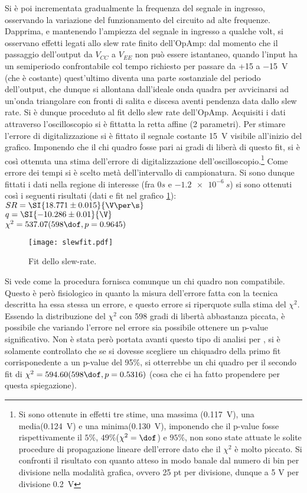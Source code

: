 Si è poi incrementata gradualmente la frequenza del segnale in ingresso, osservando la variazione del funzionamento del circuito ad alte frequenze.
Dapprima, e mantenendo l'ampiezza del segnale in ingresso a qualche volt, si osservano effetti legati allo slew rate finito dell'OpAmp: dal momento che il passaggio dell'output da $V_{CC}$ a $V_{EE}$ non può essere istantaneo, quando l'input ha un semiperiodo confrontabile col tempo richiesto per passare da +15 a \SI{-15}{\V} (che è costante) quest'ultimo diventa una parte sostanziale del periodo dell'output, che dunque si allontana dall'ideale onda quadra per avvicinarsi ad un'onda triangolare con fronti di salita e discesa aventi pendenza data dallo slew rate.
Si è dunque proceduto al fit dello slew rate dell'OpAmp. Acquisiti i dati attraverso l'oscilloscopio si è fittatta la retta affine (2 parametri). Per stimare l'errore di digitalizzazione si è fittato il segnale costante \SI{15}{\V} visibile all'inizio del grafico. Imponendo che il chi quadro fosse pari ai gradi di liberà di questo fit, si è così ottenuta una stima dell'errore di digitalizzazione dell'oscilloscopio.\footnote{Si sono ottenute in effetti tre stime, una massima (\SI{0.117}{V}), una media(\SI{0.124}{V}) e una minima(\SI{0.130}{V}), imponendo che il p-value fosse rispettivamente il $5\%$, $49\%$($\chi^2=\dof$) e $95\%$, non sono state attuate le solite procedure di propagazione lineare dell'errore dato che il $\chi^2$ è molto piccato. Si confronti il risultato con quanto atteso in modo banale dal numero di bin per divisione nella modalità grafica, ovvero 25 pt per divisione, dunque a 5 V per divisione \SI{0.2}{V}} Come errore dei tempi si è scelto metà dell'intervallo di campionatura. Si sono dunque fittati i dati nella regione di interesse (fra $0 s$ e $\SI{-1.2e-6}{s}$) si sono ottenuti così i seguenti risultati	(dati e fit nel grafico \ref{f:SLW}):\\
$SR = \SI{18.771 \pm 0.015}{\V\per\s}$\\
$q = \SI{-10.286 \pm 0.01}{\V}$\\
$\chi^2 = 537.07 (598 \dof, p = 0.9645)$\\

\begin{figure}[h]
	\centering
	\texttt{[image: slewfit.pdf]}
	\caption{Fit dello slew-rate.}
	\label{f:SLW}
\end{figure}
Si vede come la procedura fornisca comunque un chi quadro non compatibile. Questo è però fisiologico in quanto la misura dell'errore fatta con la tecnica descritta ha essa stessa un errore, e questo errore si riperquote sulla stima del $\chi^2$. Essendo la distribuzione del $\chi^2$ con 598 gradi di libertà abbastanza piccata, è possibile che variando l'errore nel errore sia possibile ottenere un p-value significativo. Non è stata però portata avanti questo tipo di analisi per \sbatta, si è solamente controllato che se si dovesse scegliere un chiquadro della primo fit corrisponedente a un p-value del 95\%, si otterrebbe un chi quadro per il secondo fit di $\chi^2 = 594.60 (598 \dof, p = 0.5316)$ (cosa che ci ha fatto propendere per questa spiegazione). 



